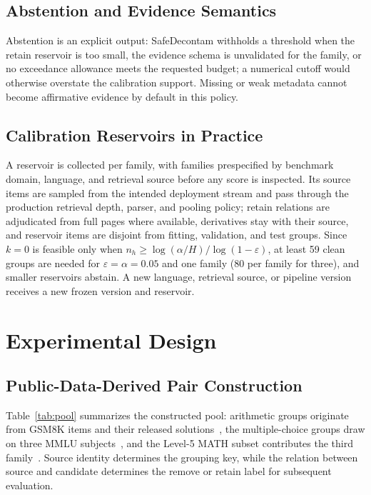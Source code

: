 \documentclass[conference]{IEEEtran}
\begin{document}
\subsection{Abstention and Evidence Semantics}
Abstention is an explicit output: SafeDecontam withholds a threshold when the retain reservoir is too small, the evidence schema is unvalidated for the family, or no exceedance allowance meets the requested budget; a numerical cutoff would otherwise overstate the calibration support. Missing or weak metadata cannot become affirmative evidence by default in this policy.

\subsection{Calibration Reservoirs in Practice}
\label{sec:reservoir}
A reservoir is collected per family, with families prespecified by benchmark domain, language, and retrieval source before any score is inspected. Its source items are sampled from the intended deployment stream and pass through the production retrieval depth, parser, and pooling policy; retain relations are adjudicated from full pages where available, derivatives stay with their source, and reservoir items are disjoint from fitting, validation, and test groups. Since $k=0$ is feasible only when $n_h\ge\log(\alpha/H)/\log(1-\varepsilon)$, at least 59 clean groups are needed for $\varepsilon=\alpha=0.05$ and one family (80 per family for three), and smaller reservoirs abstain. A new language, retrieval source, or pipeline version receives a new frozen version and reservoir.

\section{Experimental Design}
\subsection{Public-Data-Derived Pair Construction}
Table~\ref{tab:pool} summarizes the constructed pool: arithmetic groups originate from GSM8K items and their released solutions~\cite{cobbe2021}, the multiple-choice groups draw on three MMLU subjects~\cite{hendrycks2021mmlu}, and the Level-5 MATH subset contributes the third family~\cite{hendrycks2021math}. Source identity determines the grouping key, while the relation between source and candidate determines the remove or retain label for subsequent evaluation.
\end{document}
